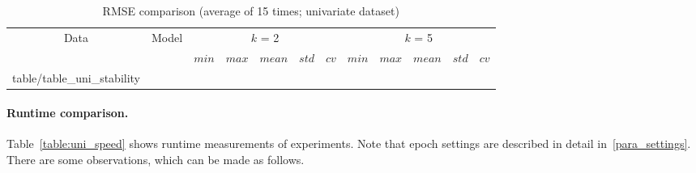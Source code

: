 \documentclass[11pt,twoside]{article}
\makeatletter
\newcommand\primitiveinput[1]
		{\@@input #1 }
\makeatother
\begin{document}
\begin{multicols}{2}

\begin{table}[!t]
	\caption{RMSE comparison (average of 15 times; univariate dataset)}
	\label{table:uni_stability}
	\centering
	\begin{adjustbox}{width=0.44\textwidth, angle=270}
	\begin{sideways}
		\begin{tabular}{| c | c| c | c | c | c | c | c | c | c | c | c |}%
		\hline
			 \multirow{2}{*}{Data} & \multirow{2}{*}{Model} & \multicolumn{5}{c|}{$k$ = 2} & \multicolumn{5}{c|}{ $k$ = 5 } \\ 
			 \cline{3-12}
	   		& & $min$ & $max$ & $mean$ & $std$ & $cv$ &   $min$ & $max$ & $mean$ & $std$ & $cv$ \\ [0.5ex] 
		\hline
			\primitiveinput{table/table_uni_stability}
		\hline
		\end{tabular}
	\end{sideways}
	\end{adjustbox}
\end{table}



\paragraph{\textbf{Runtime comparison.}} Table~\ref{table:uni_speed} shows runtime measurements of experiments. Note that epoch settings are described in detail in~\ref{para_settings}. There are some observations, which can be made as follows.


\end{multicols}
\end{document}
